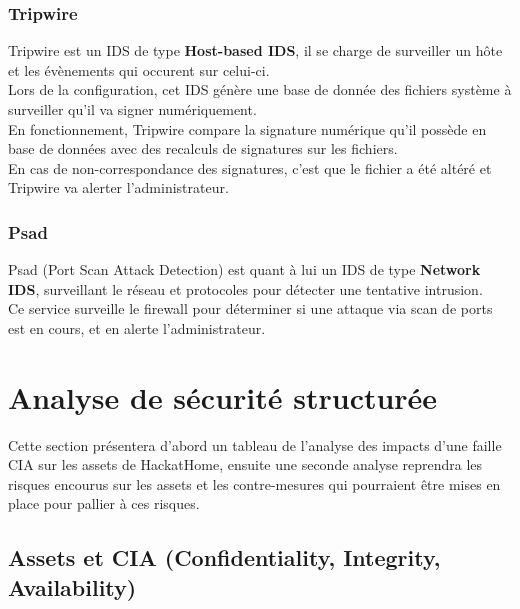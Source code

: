 \documentclass[a4paper,10pt,final,fleqn]{article}
\begin{document}
			\subsubsection{Tripwire}

				Tripwire est un IDS de type \textbf{Host-based IDS}, il se charge de surveiller un hôte et les évènements qui occurent sur celui-ci.\\

				Lors de la configuration, cet IDS génère une base de donnée des fichiers système à surveiller qu'il va signer numériquement.\\

				En fonctionnement, Tripwire compare la signature numérique qu'il possède en base de données avec des recalculs de signatures sur les fichiers.\\

				En cas de non-correspondance des signatures, c'est que le fichier a été altéré et Tripwire va alerter l'administrateur.\\

			\subsubsection{Psad}

				Psad (Port Scan Attack Detection) est quant à lui un IDS de type \textbf{Network IDS}, surveillant le réseau et protocoles pour détecter une tentative intrusion.\\

				Ce service surveille le firewall pour déterminer si une attaque via scan de ports est en cours, et en alerte l'administrateur.\\


	\section{Analyse de sécurité structurée}

		Cette section présentera d'abord un tableau de l'analyse des impacts d'une faille CIA sur les assets de HackatHome, ensuite une seconde analyse reprendra les risques encourus sur les assets et les contre-mesures qui pourraient être mises en place pour pallier à ces risques.\\

		\subsection{Assets et CIA (Confidentiality, Integrity, Availability)}
\end{document}
